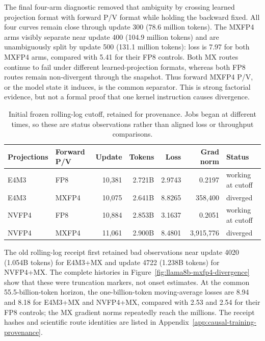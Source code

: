 The final four-arm diagnostic removed that ambiguity by crossing learned
projection format with forward P/V format while holding the backward fixed.
All four curves remain close through update 300 (78.6 million tokens).  The
MXFP4 arms visibly separate near update 400 (104.9 million tokens) and are
unambiguously split by update 500 (131.1 million tokens): loss is 7.97 for
both MXFP4 arms, compared with 5.41 for their FP8 controls.  Both MX routes
continue to fail under different learned-projection formats, whereas both FP8
routes remain non-divergent through the snapshot.  Thus forward MXFP4 P/V, or
the model state it induces, is the common separator.  This is strong
factorial evidence, but not a formal proof that one kernel instruction causes
divergence.

\begin{table}[htbp]
\centering
\caption{Initial frozen rolling-log cutoff, retained for provenance.  Jobs
began at different times, so these are status observations rather than
aligned loss or throughput comparisons.}
\label{tab:v509-four-arm-cutoff}
\small
\begin{tabular}{llrrrrl}
\toprule
Projections & Forward P/V & Update & Tokens & Loss & Grad norm & Status \\
\midrule
E4M3  & FP8   & 10,381 & 2.721B & 2.9743 & 0.2197 & working at cutoff \\
E4M3  & MXFP4 & 10,075 & 2.641B & 8.8265 & 358,400 & diverged \\
NVFP4 & FP8   & 10,884 & 2.853B & 3.1637 & 0.2051 & working at cutoff \\
NVFP4 & MXFP4 & 11,061 & 2.900B & 8.4801 & 3,915,776 & diverged \\
\bottomrule
\end{tabular}
\end{table}
\FloatBarrier

The old rolling-log receipt first retained bad observations near update 4020
(1.054B tokens) for E4M3+MX and update 4722 (1.238B tokens) for NVFP4+MX.
The complete histories in Figure~\ref{fig:llama8b-mxfp4-divergence} show that
these were truncation markers, not onset estimates.  At the common
55.5-billion-token horizon, the one-billion-token moving-average losses are
8.94 and 8.18 for E4M3+MX and NVFP4+MX, compared with 2.53 and 2.54 for their
FP8 controls; the MX gradient norms repeatedly reach the millions.  The
receipt hashes and scientific route identities are listed in
Appendix~\ref{app:causal-training-provenance}.

